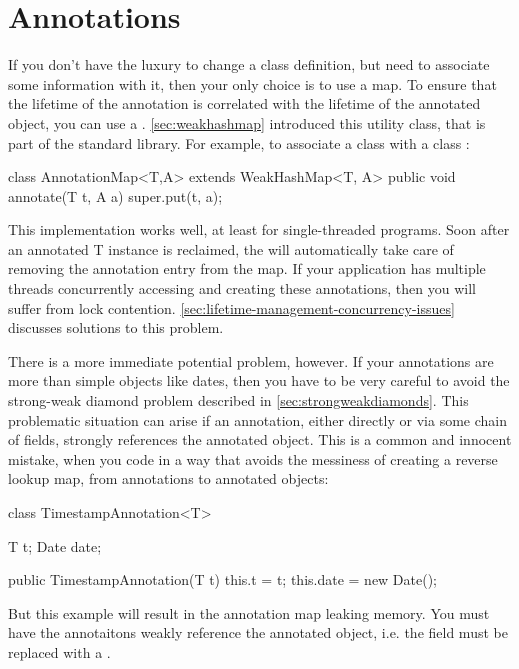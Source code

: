 \section{Annotations}

If you don't have the luxury to change a class definition, but need to associate
some information with it, then your only choice is to use a map. To ensure that
the lifetime of the annotation is correlated with the lifetime of the annotated
object, you can use a . \autoref{sec:weakhashmap} introduced
this utility class, that is part of the standard library. For example, to
associate a class  with a class :

\begin{shortlisting}
class AnnotationMap<T,A> extends WeakHashMap<T, A> {
   public void annotate(T t, A a) {
      super.put(t, a);
   }
}
\end{shortlisting}

This implementation works well, at least for single-threaded programs. Soon after
an annotated T instance is reclaimed, the  will automatically
take care of removing the annotation entry from the map. If your application has
multiple threads concurrently accessing and creating these annotations, then you
will suffer from lock contention.
\autoref{sec:lifetime-management-concurrency-issues} discusses solutions to this
problem.

There is a more immediate potential problem, however. If your annotations are
more than simple objects like dates, then you have to be very careful to avoid
the strong-weak diamond problem described in \autoref{sec:strongweakdiamonds}.
This problematic situation can arise if an annotation, either directly or via
some chain of fields, strongly references the annotated object. This is a common
and innocent mistake, when you code in a way that avoids the messiness of
creating a reverse lookup map, from annotations to annotated objects:
\begin{shortlisting}
class TimestampAnnotation<T> {
   T t;
   Date date;
   
   public TimestampAnnotation(T t) {
      this.t = t;
      this.date = new Date();
   }
}
\end{shortlisting}
But this example will result in the annotation map leaking memory. You must have
the annotaitons weakly reference the annotated object, i.e. the  field
must be replaced with a . 

